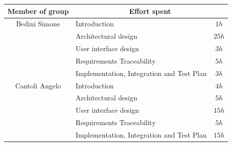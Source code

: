 \begin{table}[h!]
\centering
\renewcommand{\arraystretch}{1.5} %
\begin{tabular}{c|l|c}
    \hline
    Member of group & \multicolumn{2}{c}{Effort spent} \\
    \hline
    Bedini Simone & Introduction & $1h$ \\
                                 & Architectural design & $25h$ \\
                                 & User interface design & $3h$ \\
                                 & Requirements Traceability & $5h$ \\
                                 & Implementation, Integration and Test Plan & $3h$ \\
    \hline
    Cantoli Angelo & Introduction & $4h$ \\
                                 & Architectural design & $5h$ \\
                                 & User interface design & $15h$ \\
                                 & Requirements Traceability & $5h$ \\
                                 & Implementation, Integration and Test Plan & $15h$ \\
    \hline
\end{tabular}
\end{table}